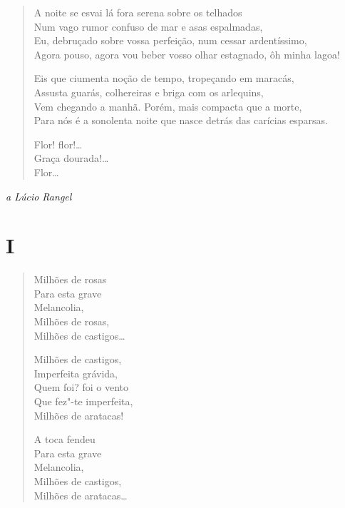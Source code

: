 {\begin{verse}
A noite se esvai lá fora serena sobre os telhados\\
Num vago rumor confuso de mar e asas espalmadas,\\
Eu, debruçado sobre vossa perfeição, num cessar ardentíssimo,\\
Agora pouso, agora vou beber vosso olhar estagnado, ôh minha lagoa!

Eis que ciumenta noção de tempo, tropeçando em maracás,\\
Assusta guarás, colhereiras e briga com os arlequins,\\
Vem chegando a manhã. Porém, mais compacta que a morte,\\
Para nós é a sonolenta noite que nasce detrás das carícias esparsas.

Flor! flor!\ldots{}\\
\qquad\qquad Graça dourada!\ldots{}\\
\qquad\qquad\qquad\qquad\qquad\quad Flor\ldots{}
\end{verse}


\begin{flushright}
\emph{a Lúcio Rangel}
\end{flushright}

\section*{I}

\begin{verse}
Milhões de rosas\\
Para esta grave\\
Melancolia,\\
Milhões de rosas,\\
Milhões de castigos\ldots{}

Milhões de castigos,\\
Imperfeita grávida,\\
Quem foi? foi o vento\\
Que fez"-te imperfeita,\\
Milhões de aratacas!

A toca fendeu\\
Para esta grave\\
Melancolia,\\
Milhões de castigos,\\
Milhões de aratacas\ldots{}


\end{verse}}

